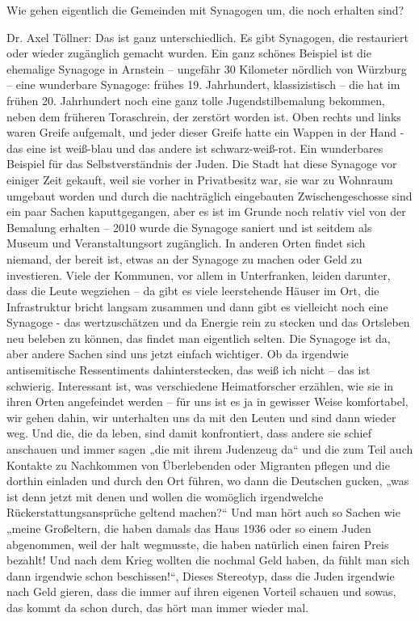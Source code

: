 Wie gehen eigentlich die Gemeinden mit Synagogen um, die noch erhalten sind? 

Dr. Axel Töllner: Das ist ganz unterschiedlich. Es gibt Synagogen, die restauriert oder wieder zugänglich gemacht wurden. Ein ganz schönes Beispiel ist die ehemalige Synagoge in Arnstein – ungefähr 30 Kilometer nördlich von Würzburg – eine wunderbare Synagoge: frühes 19. Jahrhundert, klassizistisch – die hat im frühen 20. Jahrhundert noch eine ganz tolle Jugendstilbemalung bekommen, neben dem früheren Toraschrein, der zerstört worden ist. Oben rechts und links waren Greife aufgemalt, und jeder dieser Greife hatte ein Wappen in der Hand - das eine ist weiß-blau und das andere ist schwarz-weiß-rot. Ein wunderbares Beispiel für das Selbstverständnis der Juden. 
Die Stadt hat diese Synagoge vor einiger Zeit gekauft, weil sie vorher in Privatbesitz war, sie war zu Wohnraum umgebaut worden und durch die nachträglich eingebauten Zwischengeschosse sind ein paar Sachen kaputtgegangen, aber es ist im Grunde noch relativ viel von der Bemalung erhalten – 2010 wurde die Synagoge saniert und ist seitdem als Museum und Veranstaltungsort zugänglich.  
In anderen Orten findet sich niemand, der bereit ist, etwas an der Synagoge zu machen oder Geld zu investieren. Viele der Kommunen, vor allem in Unterfranken, leiden darunter, dass die Leute wegziehen – da gibt es viele leerstehende Häuser im Ort, die Infrastruktur bricht langsam zusammen und dann gibt es vielleicht noch eine Synagoge - das wertzuschätzen und da Energie rein zu stecken und das Ortsleben neu beleben zu können, das findet man eigentlich selten. Die Synagoge ist da, aber andere Sachen sind uns jetzt einfach wichtiger. Ob da irgendwie antisemitische Ressentiments dahinterstecken, das weiß ich nicht – das ist schwierig. 
Interessant ist, was verschiedene Heimatforscher erzählen, wie sie in ihren Orten angefeindet werden – für uns ist es ja in gewisser Weise komfortabel, wir gehen dahin, wir unterhalten uns da mit den Leuten und sind dann wieder weg. Und die, die da leben, sind damit konfrontiert, dass andere sie schief anschauen und immer sagen „die mit ihrem Judenzeug da“ und die zum Teil auch Kontakte zu Nachkommen von Überlebenden oder Migranten pflegen und die dorthin einladen und durch den Ort führen, wo dann die Deutschen gucken, „was ist denn jetzt mit denen und wollen die womöglich irgendwelche Rückerstattungsansprüche geltend machen?“ 
Und man hört auch so Sachen wie „meine Großeltern, die haben damals das Haus 1936 oder so einem Juden abgenommen, weil der halt wegmusste, die haben natürlich einen fairen Preis bezahlt! Und nach dem Krieg wollten die nochmal Geld haben, da fühlt man sich dann irgendwie schon beschissen!“, Dieses Stereotyp, dass die Juden irgendwie nach Geld gieren, dass die immer auf ihren eigenen Vorteil schauen und sowas, das kommt da schon durch, das hört man immer wieder mal.  
